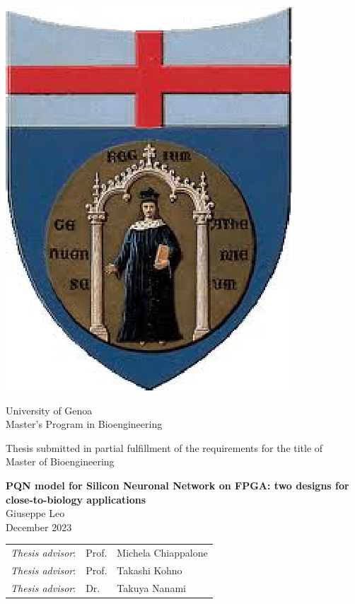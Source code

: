 
\thispagestyle{empty}

\begin{center}
	\includegraphics[width=0.2\linewidth]{img/unige.eps}
\end{center}
	
	\begin{center} 
		\LARGE\sc
		University of Genoa\\
		
		\vspace{0.5cm}
		\large
		Master's Program in Bioengineering\\
	\end{center}
	
	\begin{center} 
		\small
		Thesis submitted in partial fulfillment of the requirements for the title of \\
		Master of Bioengineering\\
	\end{center}

	\vfill
	
	\begin{center} 
		\LARGE
		{\bf {PQN model for Silicon Neuronal Network on FPGA: 
		two designs for close-to-biology applications}}\\
		\vspace{0.5cm}
		\large
		Giuseppe Leo\\
		\vspace{0.5cm}
		\small
		December 2023
	\end{center}

	\vfill
	
	\begin{tabular}{lll}%
	{\em Thesis advisor}:	& Prof.	& Michela Chiappalone\\
	{\em Thesis advisor}:	& Prof.	 & Takashi Kohno\\
	{\em Thesis advisor}:	& Dr.	 & Takuya Nanami\\
	\end{tabular} 

\hfill


